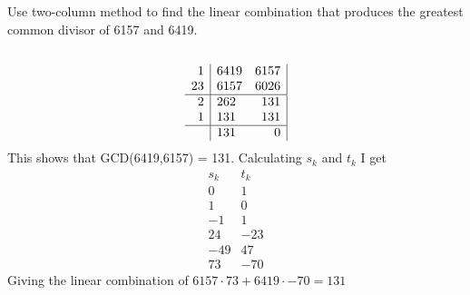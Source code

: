 \documentclass[12pt]{article}
\newenvironment{problem}[2][Problem]{\begin{trivlist}
\item[\hskip \labelsep {\bfseries #1}\hskip \labelsep {\bfseries #2.}]}{\end{trivlist}}
\begin{document}
\begin{problem}{4}
Use two-column method to find the linear combination that produces the greatest common divisor of 6157 and 6419. \\ \\
\[ \begin{array}{r|r|r}
1 &6419 \quad 6157 \\ 23 &6157 \quad 6026 \\\hline
2 &262 \quad \quad 131 \\
1 & 131 \quad \quad 131 \\\hline
 & 131 \quad \quad \quad 0
\end{array}
\]
This shows that GCD(6419,6157) = 131. Calculating $s_k$ and $t_k$ I get
\[ 
\begin{array}{r|r}
s_k & t_k \\\hline
0 & 1 \\\hline
1 & 0 \\\hline
-1 & 1 \\\hline
24 & -23 \\\hline
-49 & 47 \\\hline
73 & -70
\end{array}
\]
Giving the linear combination of $6157 \cdot 73 + 6419 \cdot -70 = 131$
\end{problem}
\end{document}
